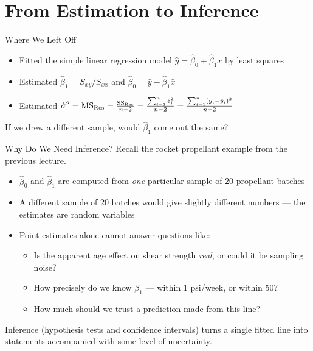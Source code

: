 \section{From Estimation to Inference}

\begin{frame}{Where We Left Off}
	\begin{itemize}
		\item Fitted the simple linear regression model $\hat y = \hat\beta_0+\hat\beta_1 x$ by least squares
		\item Estimated $\hat\beta_1 = S_{xy}/S_{xx}$ and $\hat\beta_0 = \bar y-\hat\beta_1\bar x$
		\item Estimated $\hat\sigma^2 = \mathrm{MS}_{\mathrm{Res}} = \frac{\mathrm{SS}_{\mathrm{Res}}}{n-2} = \frac{\sum_{i=1}^n \hat\varepsilon_i^2}{n-2} = \frac{\sum_{i=1}^n (y_i - \hat y_i)^2}{n-2}$
	\end{itemize}

	\svspace{1em}

	If we drew a different sample, would $\hat\beta_1$ come out the same?
\end{frame}


\begin{frame}{Why Do We Need Inference?}
	Recall the rocket propellant example from the previous lecture.
	\begin{itemize}
		\item $\hat\beta_0$ and $\hat\beta_1$ are computed from \emph{one} particular sample of 20 propellant batches
		\item A different sample of 20 batches would give slightly different numbers --- the estimates are random variables
		\item Point estimates alone cannot answer questions like:
		\begin{itemize}
			\item Is the apparent age effect on shear strength \emph{real}, or could it be sampling noise?
			\item How precisely do we know $\beta_1$ --- within 1 psi/week, or within 50?
			\item How much should we trust a prediction made from this line?
		\end{itemize}
	\end{itemize}
	\svspace{0.5em}
	Inference (hypothesis tests and confidence intervals) turns a single fitted line into statements accompanied with some level of uncertainty.
\end{frame}


